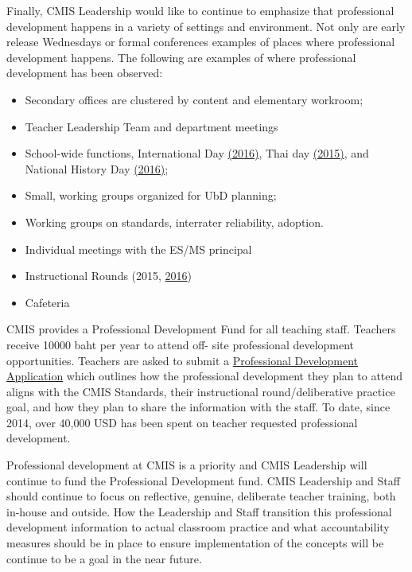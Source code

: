 \documentclass{report}
\begin{document}
\begin{findings}
 
Finally, CMIS Leadership would like to continue to emphasize that professional development happens in a variety of settings and environment.  Not only are early release Wednesdays or formal conferences examples of places where professional development happens. The following are examples of where professional development has been observed:
\begin{itemize}
\item Secondary offices are clustered by content and elementary workroom; 
\item Teacher Leadership Team and department meetings
\item School-wide functions, International Day \href{https://drive.google.com/drive/folders/0B0TYmzaZNi3fbnhzMzNNT3hKNm8?usp=sharing}{(2016)}, Thai day \href{https://drive.google.com/drive/folders/0B0TYmzaZNi3ffjNvUG85bU12TExQR1ZjMGtqcVZ1UFZrYWpwNHFGbDg2NFdrcDVmRmxkMmM?usp=sharing}{(2015)}, and National History Day \href{https://drive.google.com/drive/folders/0B0TYmzaZNi3fUkdpR1hLaDVaekk?usp=sharing}{(2016)};
\item Small, working groups organized for UbD planning;
\item Working groups on standards, interrater reliability, adoption. 
\item Individual meetings with the ES/MS principal
\item Instructional Rounds (2015, \href{https://drive.google.com/drive/folders/0B0TYmzaZNi3fbFVYTXpySHNDLUU?usp=sharing}{2016})
\item Cafeteria 
\end{itemize}


CMIS provides a Professional Development Fund for all teaching staff. Teachers receive 10000 baht per year to attend off- site professional development opportunities. Teachers are asked to submit a \href{https://docs.google.com/document/d/1zDwr8diiahPkrMQktXVF2-Us5eL-uVJDvdQLrbDNo8Q/edit}{Professional Development Application} which outlines how the professional development they plan to attend aligns with the CMIS Standards, their instructional round/deliberative practice goal, and how they plan to share the information with the staff. To date, since 2014, over 40,000 USD has been spent on teacher requested professional development. 


Professional development at CMIS is a priority and CMIS Leadership will continue to fund the Professional Development fund. CMIS Leadership and Staff should continue to focus on reflective, genuine, deliberate teacher training, both in-house and outside. How the Leadership and Staff transition this professional development information to actual classroom practice and what accountability measures should be in place to ensure implementation of the concepts will be continue to be a goal in the near future. 
\end{findings}
\end{document}
